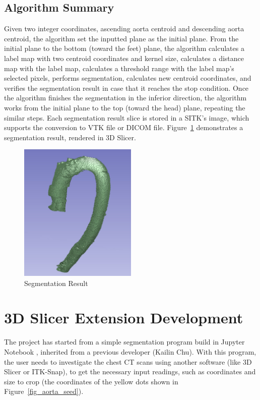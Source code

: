 \subsection{Algorithm Summary}
Given two integer coordinates, ascending aorta centroid and descending aorta centroid, the algorithm set the inputted plane as the initial plane. From the initial plane to the bottom (toward the feet) plane, the algorithm calculates a label map with two centroid coordinates and kernel size, calculates a distance map with the label map, calculates a threshold range with the label map's selected pixels, performs segmentation, calculates new centroid coordinates, and verifies the segmentation result in case that it reaches the stop condition. Once the algorithm finishes the segmentation in the inferior direction, the algorithm works from the initial plane to the top (toward the head) plane, repeating the similar steps. Each segmentation result slice is stored in a SITK's image, which supports the conversion to VTK file or DICOM file. Figure~\ref{fig_sr} demonstrates a segmentation result, rendered in 3D Slicer.

\begin{figure}[H]
    \centering
    \includegraphics[width=0.5\textwidth]{figures/AGR/segmentation_result.jpg}
    \caption[Segmentation Result]{Segmentation Result}
    \label{fig_sr}
\end{figure}

\section{3D Slicer Extension Development}
The project has started from a simple segmentation program build in Jupyter Notebook \cite{Kluyver2016jupyter}, inherited from a previous developer (Kailin Chu). With this program, the user needs to investigate the chest CT scans using another software (like 3D Slicer or ITK-Snap), to get the necessary input readings, such as coordinates and size to crop (the coordinates of the yellow dots shown in Figure~\ref{fig_aorta_seed}).

